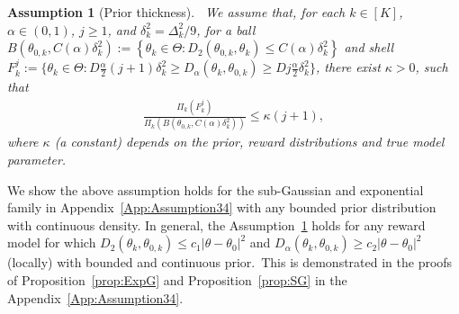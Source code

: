 \documentclass[11pt]{article}
\newtheorem{assumption}{Assumption}[section]
\begin{document}
\begin{assumption}[Prior thickness]~\label{ass:prior2}
            We assume that, for each $k\in[K]$, $\alpha\in(0,1)$, $j\geq 1$, and $\delta_k^2=\Delta_k^2/9$, for  a ball $B\left(\theta_{0,k}, C(\alpha)\delta_k^2 \right) := \left\{  \theta_k \in \Theta:D_2(\theta_{0,k},\theta_k)\leq  C(\alpha)\delta_k^2 \right\} $ and shell $F_k^j:= \big\{\theta_k \in \Theta: D\frac{\alpha}{2} (j+1) \delta_k^2 \geq D_{\alpha}(\theta_k,\theta_{0,k}) \geq D j \frac{\alpha}{2} \delta_k^2  \big\}$, there exist $\kappa > 0$, such that 
        \begin{align}\tag{B1} \frac{\Pi_k(F_k^j)}{\Pi_k(B\left(\theta_{0,k},C(\alpha)\delta_k^2 \right) )} \leq \kappa(j+1),
            \end{align}
        where $\kappa$ (a constant) depends on the prior, reward distributions and true model parameter.
        \end{assumption}

We show the above assumption holds for the sub-Gaussian and exponential family in Appendix~\ref{App:Assumption34} with any bounded prior distribution with continuous density. In general, the  Assumption~\ref{ass:prior2}  holds for any reward model for which $D _{2}(\theta_k, \theta_{0,k}) \leq  c_1 |\theta-\theta_0|^2$  and $D _{\alpha}(\theta_k, \theta_{0,k}) \geq c_2 |\theta-\theta_0|^2$ (locally) with bounded and continuous prior.~This is demonstrated in the proofs of Proposition~\ref{prop:ExpG} and Proposition~\ref{prop:SG} in the Appendix~\ref{App:Assumption34}.
\end{document}
